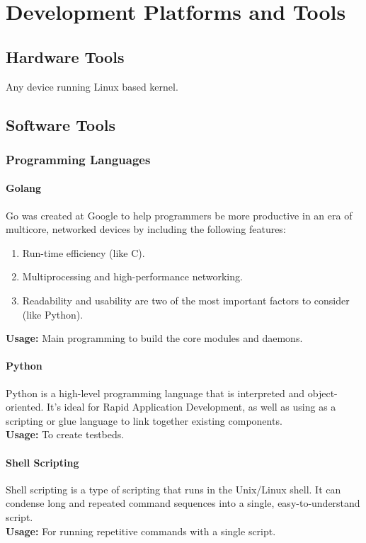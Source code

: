 \chapter{Development Platforms and Tools}
\section{Hardware Tools }
Any device running Linux based kernel.

\section{Software Tools }
\subsection{Programming Languages}
\subsubsection{Golang}
Go was created at Google to help programmers be more productive in an era of multicore, networked devices by including the following features: 
\begin{enumerate}[itemsep=1pt, topsep=5pt]
    \item Run-time efficiency (like C).
    \item Multiprocessing and high-performance networking.
    \item Readability and usability are two of the most important factors to consider (like Python).
\end{enumerate}
\textbf{Usage:} Main programming to build the core modules and daemons.

\subsubsection{Python}
Python is a high-level programming language that is interpreted and object-oriented. It's ideal for Rapid Application Development, as well as using as a scripting or glue language to link together existing components.
\\
\textbf{Usage:} To create testbeds.

\subsubsection{Shell Scripting}
Shell scripting is a type of scripting that runs in the Unix/Linux shell.
It can condense long and repeated command sequences into a single, easy-to-understand script.
\\
\textbf{Usage:} For running repetitive commands with a single script.


